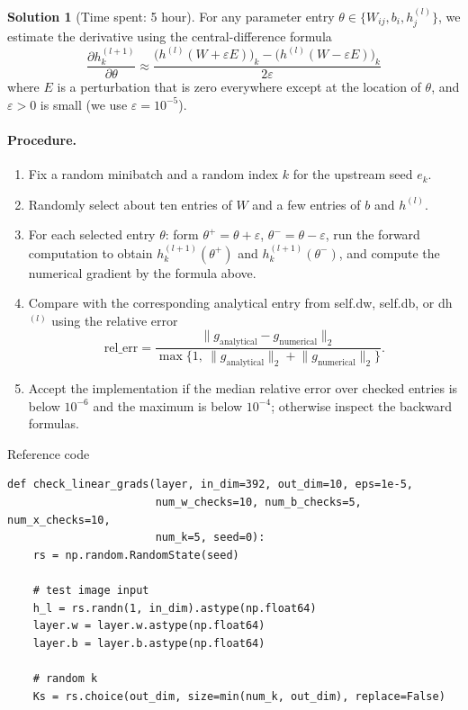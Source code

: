 \documentclass[11pt, reqno, letterpaper, twoside]{amsart}
\theoremstyle{plain}
\theoremstyle{definition}
\newtheorem{solution}[theorem]{Solution}
\begin{document}
\begin{solution}[Time spent: 5 hour]
For any parameter entry $\theta \in \{W_{ij}, b_i, h^{(l)}_j\}$, we estimate the derivative using the
central-difference formula
\[
\frac{\partial h^{(l+1)}_k}{\partial \theta}
\approx
\frac{ \big(h^{(l)}(W+\varepsilon E)\big)_{k} - \big(h^{(l)}(W-\varepsilon E)\big)_{k} }{2\varepsilon}
\]
where $E$ is a perturbation that is zero everywhere except at the location of $\theta$,
and $\varepsilon > 0$ is small (we use $\varepsilon = 10^{-5}$).

\paragraph{Procedure.}
\begin{enumerate}
  \item Fix a random minibatch and a random index $k$ for the upstream seed $e_k$.
  \item Randomly select about ten entries of $W$ and a few entries of $b$ and $h^{(l)}$.
  \item For each selected entry $\theta$:
        form $\theta^{+}=\theta+\varepsilon$, $\theta^{-}=\theta-\varepsilon$,
        run the forward computation to obtain $h^{(l+1)}_k(\theta^{+})$ and $h^{(l+1)}_k(\theta^{-})$,
        and compute the numerical gradient by the formula above.
  \item Compare with the corresponding analytical entry from self.dw, self.db, or dh$^{(l)}$ using the
        relative error
        \[
        \text{rel\_err} =
        \frac{\lVert g_{\text{analytical}} - g_{\text{numerical}} \rVert_2}
             {\max\{1,\ \lVert g_{\text{analytical}} \rVert_2 + \lVert g_{\text{numerical}} \rVert_2\}} .
        \]
  \item Accept the implementation if the median relative error over checked entries is below $10^{-6}$
        and the maximum is below $10^{-4}$; otherwise inspect the backward formulas.
\end{enumerate}


Reference code\\
\begin{lstlisting}
def check_linear_grads(layer, in_dim=392, out_dim=10, eps=1e-5,
                       num_w_checks=10, num_b_checks=5, num_x_checks=10,
                       num_k=5, seed=0):
    rs = np.random.RandomState(seed)

    # test image input
    h_l = rs.randn(1, in_dim).astype(np.float64)
    layer.w = layer.w.astype(np.float64)
    layer.b = layer.b.astype(np.float64)

    # random k
    Ks = rs.choice(out_dim, size=min(num_k, out_dim), replace=False)


\end{lstlisting}
\end{solution}
\end{document}
